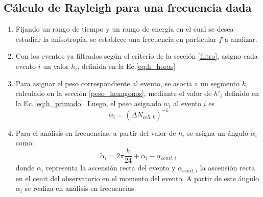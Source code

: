 
  \subsection{Cálculo de Rayleigh para una frecuencia dada} \label{rayleigh}

        \begin{enumerate}
        \item Fijando un rango de tiempo y un rango de energía en el cual se desea estudiar la anisotropía, se establece una frecuencia en particular $f$ a analizar.

        \item Con los eventos ya filtrados según el criterio de la sección \ref{filtro}, asigno cada evento $i$ un valor $h_i$, definida en la Ec.\ref{eq:h_horas}

        \item Para asignar el peso correspondiente al evento, se asocia a un segmento $k$, calculado en la sección \ref{peso_hexagonos}, mediante el valor de $h'_i$ definido en la Ec.\,\ref{eq:h_primado}. Luego, el peso asignado $w_i$  al evento $i$ es
        \begin{equation*}
           w_{i}= (\Delta N_{cell,k})^{-1}
        \end{equation*} 
         
        \item Para el análisis en frecuencias, a partir del valor de $h_i$ se asigna un ángulo $\tilde{\alpha}_i$ como:
        \begin{equation}
         \tilde{\alpha}_i = 2\pi \frac{h}{24} + \alpha_i -\alpha_{cenit,i}
        \end{equation}
        donde $\alpha_i$  representa la ascensión recta del evento y $\alpha_{cenit,i}$ la ascensión recta en el cenit del observatorio en el momento del evento. A partir de este ángulo $\tilde{\alpha}_i$ se realiza en análisis en frecuencias.


\end{enumerate}
